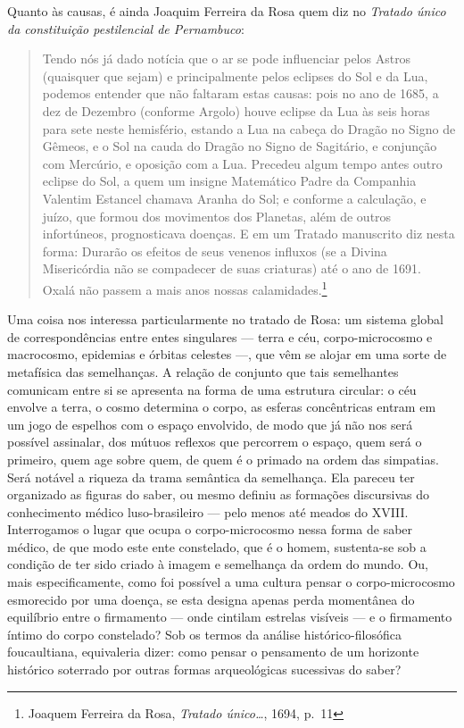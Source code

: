 Quanto às causas, é ainda Joaquim Ferreira da Rosa quem diz no
\textit{Tratado único da constituição pestilencial de Pernambuco}:

\begin{quote}
Tendo nós já dado notícia que o ar se pode influenciar pelos Astros
(quaisquer que sejam) e principalmente pelos eclipses do Sol e da Lua,
podemos entender que não faltaram estas causas: pois no ano de 1685, a
dez de Dezembro (conforme Argolo) houve eclipse da Lua às seis horas
para sete neste hemisfério, estando a Lua na cabeça do Dragão no Signo
de Gêmeos, e o Sol na cauda do Dragão no Signo de Sagitário, e conjunção
com Mercúrio, e oposição com a Lua. Precedeu algum tempo antes outro
eclipse do Sol, a quem um insigne Matemático Padre da Companhia Valentim
Estancel chamava Aranha do Sol; e conforme a calculação, e juízo, que
formou dos movimentos dos Planetas, além de outros infortúneos,
prognosticava doenças. E em um Tratado manuscrito diz nesta forma:
Durarão os efeitos de seus venenos influxos (se a Divina Misericórdia
não se compadecer de suas criaturas) até o ano de 1691. Oxalá não passem
a mais anos nossas calamidades.\footnote{Joaquem Ferreira da Rosa,
  \textit{Tratado único\ldots{}}, 1694, p.~11}
\end{quote}

Uma coisa nos interessa particularmente no tratado de Rosa: um sistema
global de correspondências entre entes singulares --- terra e céu,
corpo-microcosmo e macrocosmo, epidemias e órbitas celestes ---, que vêm
se alojar em uma sorte de metafísica das semelhanças. A relação de
conjunto que tais semelhantes comunicam entre si se apresenta na forma
de uma estrutura circular: o céu envolve a terra, o cosmo determina o
corpo, as esferas concêntricas entram em um jogo de espelhos com o
espaço envolvido, de modo que já não nos será possível assinalar, dos
mútuos reflexos que percorrem o espaço, quem será o primeiro, quem age
sobre quem, de quem é o primado na ordem das simpatias. Será notável a
riqueza da trama semântica da semelhança. Ela pareceu ter organizado as
figuras do saber, ou mesmo definiu as formações discursivas do
conhecimento médico luso-brasileiro --- pelo menos até meados do XVIII.
Interrogamos o lugar que ocupa o corpo-microcosmo nessa forma de saber
médico, de que modo este ente constelado, que é o homem, sustenta-se sob
a condição de ter sido criado à imagem e semelhança da ordem do mundo.
Ou, mais especificamente, como foi possível a uma cultura pensar o
corpo-microcosmo esmorecido por uma doença, se esta designa apenas perda
momentânea do equilíbrio entre o firmamento --- onde cintilam estrelas
visíveis --- e o firmamento íntimo do corpo constelado? Sob os termos da
análise histórico-filosófica foucaultiana, equivaleria dizer: como
pensar o pensamento de um horizonte histórico soterrado por outras
formas arqueológicas sucessivas do saber?

